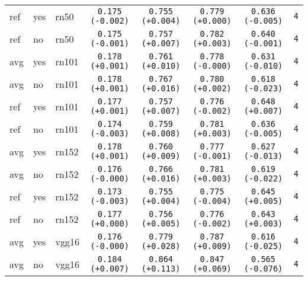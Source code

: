 \begin{tabular}{|l|l|l|c|c|c|c|c|}
ref & yes & rn50 & \texttt{0.175 {\color{red}(-0.002)}} & \texttt{0.755 {\color{red}(+0.004)}} & \texttt{0.779 {\color{black}(+0.000)}} & \texttt{0.636 {\color{red}(-0.005)}} & \texttt{4} \\
ref & no & rn50 & \texttt{0.175 {\color{red}(-0.001)}} & \texttt{0.757 {\color{red}(+0.007)}} & \texttt{0.782 {\color{red}(+0.003)}} & \texttt{0.640 {\color{red}(-0.001)}} & \texttt{4} \\
\hline
avg & yes & rn101 & \texttt{0.178 {\color{green}(+0.001)}} & \texttt{0.761 {\color{red}(+0.010)}} & \texttt{0.778 {\color{black}(-0.000)}} & \texttt{0.631 {\color{red}(-0.010)}} & \texttt{4} \\
avg & no & rn101 & \texttt{0.178 {\color{green}(+0.001)}} & \texttt{0.767 {\color{red}(+0.016)}} & \texttt{0.780 {\color{red}(+0.002)}} & \texttt{0.618 {\color{red}(-0.023)}} & \texttt{4} \\
ref & yes & rn101 & \texttt{0.177 {\color{green}(+0.001)}} & \texttt{0.757 {\color{red}(+0.007)}} & \texttt{0.776 {\color{green}(-0.002)}} & \texttt{0.648 {\color{green}(+0.007)}} & \texttt{4} \\
ref & no & rn101 & \texttt{0.174 {\color{red}(-0.003)}} & \texttt{0.759 {\color{red}(+0.008)}} & \texttt{0.781 {\color{red}(+0.003)}} & \texttt{0.636 {\color{red}(-0.005)}} & \texttt{4} \\
\hline
avg & yes & rn152 & \texttt{0.178 {\color{green}(+0.001)}} & \texttt{0.760 {\color{red}(+0.009)}} & \texttt{0.777 {\color{green}(-0.001)}} & \texttt{0.627 {\color{red}(-0.013)}} & \texttt{4} \\
avg & no & rn152 & \texttt{0.176 {\color{black}(-0.000)}} & \texttt{0.766 {\color{red}(+0.016)}} & \texttt{0.781 {\color{red}(+0.003)}} & \texttt{0.619 {\color{red}(-0.022)}} & \texttt{4} \\
ref & yes & rn152 & \texttt{0.173 {\color{red}(-0.003)}} & \texttt{0.755 {\color{red}(+0.004)}} & \texttt{0.775 {\color{green}(-0.004)}} & \texttt{0.645 {\color{green}(+0.005)}} & \texttt{4} \\
ref & no & rn152 & \texttt{0.177 {\color{black}(+0.000)}} & \texttt{0.756 {\color{red}(+0.005)}} & \texttt{0.776 {\color{green}(-0.002)}} & \texttt{0.643 {\color{green}(+0.003)}} & \texttt{4} \\
\hline
avg & yes & vgg16 & \texttt{0.176 {\color{black}(-0.000)}} & \texttt{0.779 {\color{red}(+0.028)}} & \texttt{0.787 {\color{red}(+0.009)}} & \texttt{0.616 {\color{red}(-0.025)}} & \texttt{4} \\
avg & no & vgg16 & \texttt{0.184 {\color{green}(+0.007)}} & \texttt{0.864 {\color{red}(+0.113)}} & \texttt{0.847 {\color{red}(+0.069)}} & \texttt{0.565 {\color{red}(-0.076)}} & \texttt{4} \\

\end{tabular}
